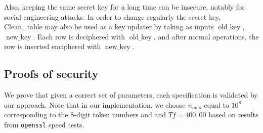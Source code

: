 \documentclass{llncs}
\DeclareMathOperator{\oldkey}{old\_key}
\DeclareMathOperator{\newkey}{new\_key}
\begin{document}
Also, keeping the same secret key for a long time can be insecure, notably for social engineering attacks. In order to change regularly the secret key, Clean\_table may also be used as a key updater by taking as inputs $\oldkey$, $\newkey$. Each row is deciphered with $\oldkey$, and after normal operations, the row is inserted enciphered with $\newkey$.

\subsection{Proofs of security}\label{sect:proof}

We prove that given a correct set of parameters, each specification is validated by our approach. Note that in our implementation, we choose $n_{\max}$ equal to $10^8$ corresponding to the 8-digit token numbers and and $Tf = 400,00$ based on results from \texttt{openssl} speed tests.
\end{document}
